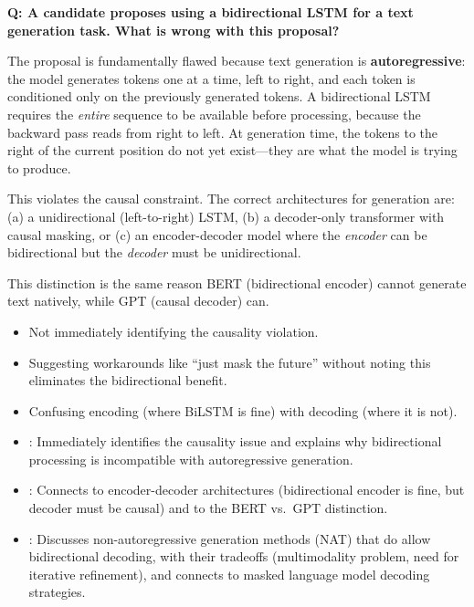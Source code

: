 \begin{interviewq}
\textbf{Q: A candidate proposes using a bidirectional LSTM for a text
generation task. What is wrong with this proposal?}

 \quad {} \quad
\badgefreq{\freqmed}

\stronganswer
The proposal is fundamentally flawed because text generation is
\textbf{autoregressive}: the model generates tokens one at a time, left
to right, and each token is conditioned only on the previously generated
tokens.  A bidirectional LSTM requires the \emph{entire} sequence to be
available before processing, because the backward pass reads from right
to left.  At generation time, the tokens to the right of the current
position do not yet exist---they are what the model is trying to
produce.

This violates the causal constraint.  The correct architectures for
generation are: (a) a unidirectional (left-to-right) LSTM, (b) a
decoder-only transformer with causal masking, or (c) an encoder-decoder
model where the \emph{encoder} can be bidirectional but the
\emph{decoder} must be unidirectional.

This distinction is the same reason BERT (bidirectional encoder) cannot
generate text natively, while GPT (causal decoder) can.

\redflags
\begin{itemize}
\item Not immediately identifying the causality violation.
\item Suggesting workarounds like ``just mask the future'' without
  noting this eliminates the bidirectional benefit.
\item Confusing encoding (where BiLSTM is fine) with decoding (where
  it is not).
\end{itemize}


\goodgreat
\begin{itemize}
\item {}: Immediately identifies the causality issue and
  explains why bidirectional processing is incompatible with
  autoregressive generation.
\item {}: Connects to encoder-decoder architectures
  (bidirectional encoder is fine, but decoder must be causal) and to
  the BERT vs.\ GPT distinction.
\item {}: Discusses non-autoregressive generation methods
  (NAT) that do allow bidirectional decoding, with their tradeoffs
  (multimodality problem, need for iterative refinement), and connects
  to masked language model decoding strategies.
\end{itemize}

\end{interviewq}


